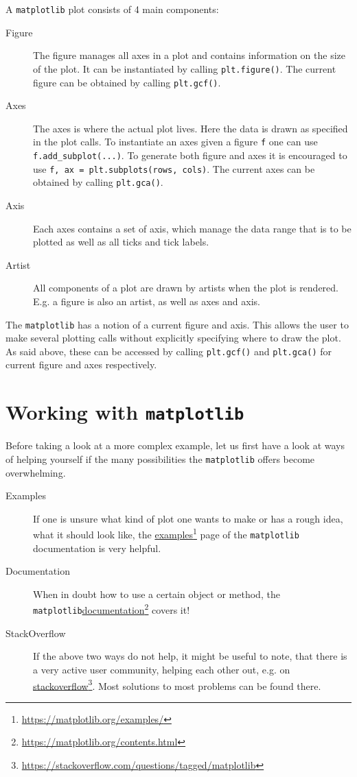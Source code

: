 \documentclass[a4paper, 11pt, onecolumn]{article}
\newcommand{\mpl}{\texttt{matplotlib}\xspace}
\newcommand{\pl}[1]{\mbox{\texttt{#1}\xspace}}
\newcommand{\fref}[2]{\href{#1}{#2}\footnote{\url{#1}}}
\begin{document}
A \mpl plot consists of 4 main components:
\begin{description}
\item[Figure]
The figure manages all axes in a plot and contains information on the size of
the plot. It can be instantiated by calling \pl{plt.figure()}. 
The current figure can be obtained by calling \pl{plt.gcf()}.

\item[Axes]
The axes is where the actual plot lives. Here the data is drawn
as specified in the plot calls. To instantiate an axes given a figure \pl{f}
one can use \pl{f.add\_subplot(...)}. To generate both figure and axes it
is encouraged to use \pl{f, ax = plt.subplots(rows, cols)}.
The current axes can be obtained by calling \pl{plt.gca()}.

\item[Axis]
Each axes contains a set of axis, which manage the data range that is to be
plotted as well as all ticks and tick labels.

\item[Artist]
All components of a plot are drawn by artists when the plot is rendered.
E.g. a figure is also an artist, as well as axes and axis.
\end{description}

The \mpl has a notion of a current figure and axis. This allows
the user to make several plotting calls without explicitly specifying where
to draw the plot. As said above, these can be accessed by calling 
\pl{plt.gcf()} and \pl{plt.gca()} for current figure and axes respectively.


\section{Working with \mpl}

Before taking a look at a more complex example, let us first have a look at
ways of helping yourself if the many possibilities the \mpl offers become overwhelming. 

\begin{description}
\item[Examples]
If one is unsure what kind of plot one wants to make or has a rough idea, what
it should look like, the \fref{https://matplotlib.org/examples/}{examples} page
of the \mpl documentation is very helpful.
\item[Documentation]
When in doubt how to use a certain object or method, the
\mpl \fref{https://matplotlib.org/contents.html}{documentation} covers it! 
\item[StackOverflow]
If the above two ways do not help, it might be useful to note, that there is a
very active user community, helping each other out, e.g. on
\fref{https://stackoverflow.com/questions/tagged/matplotlib}{stackoverflow}.
Most solutions to most problems can be found there.
\end{description}
\end{document}
